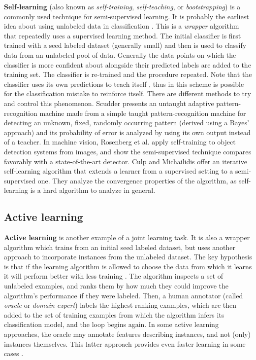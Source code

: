 {\bf Self-learning} (also known as {\em self-training}, {\em self-teaching}, or
{\em bootstrapping}) is a commonly used technique for semi-supervised learning.
It is probably the earliest idea about using unlabeled data in classification
\cite{Chapelle:2010:SL:1841234}. This is a {\em wrapper} algorithm that
repeatedly uses a supervised learning method. The initial classifier is first
trained with a seed labeled dataset (generally small) and then is used to
classify data from an unlabeled pool of data. Generally the data points on
which the classifier is more confident about alongside their predicted labels
are added to the training set. The classifier is re-trained and the procedure
repeated. Note that the classifier uses its own predictions to teach itself
\cite{Zhu05}, thus in this scheme is possible for the classification mistake to
reinforce itself. There are different methods to try and control this
phenomenon. Scudder \cite{Scudder:2006:PEA:2263254.2267291} presents an
untaught adaptive pattern-recognition machine made from a simple taught
pattern-recognition machine for detecting an unknown, fixed, randomly occurring
pattern (derived using a Bayes' approach) and its probability of error is
analyzed by using its own output instead of a teacher. In machine vision,
Rosenberg et al. \cite{4129456} apply self-training to object detection systems
from images, and show the semi-supervised technique compares favorably with a
state-of-the-art detector. Culp and Michailidis
\cite{doi:10.1198/106186008X344748} offer an iterative self-learning algorithm
that extends a learner from a supervised setting to a semi-supervised one. They
analyze the convergence properties of the algorithm, as self-learning is a hard
algorithm to analyze in general.

\subsection{Active learning}\label{sec:general_background:active}

{\bf Active learning} is another example of a joint learning task. It is also a
wrapper algorithm which trains from an initial seed labeled dataset, but uses
another approach to incorporate instances from the unlabeled dataset. The key
hypothesis is that if the learning algorithm is allowed to choose the data from
which it learns it will perform better with less training \cite{settles.tr09}.
The algorithm inspects a set of unlabeled examples, and ranks them by how much
they could improve the algorithm's performance if they were labeled. Then, a
human annotator (called {\em oracle} or {\em domain expert}) labels the highest
ranking examples, which are then added to the set of training examples from
which the algorithm infers its classification model, and the loop begins again.
In some active learning approaches, the oracle may annotate features describing
instances, and not (only) instances themselves. This latter approach provides
even faster learning in some cases \cite{druck.emnlp09}.

